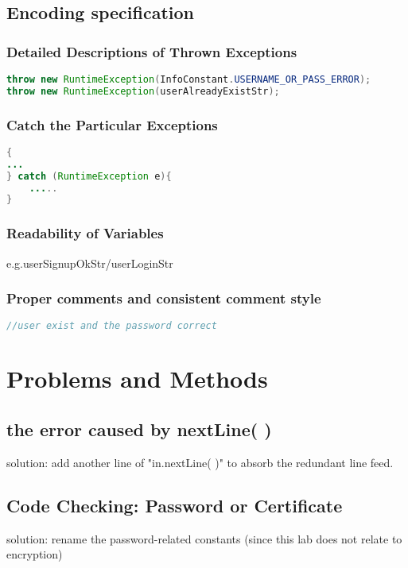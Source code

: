 \documentclass[./report.tex]{subfiles}
\begin{document}
 \subsection{Encoding specification}
  \subsubsection{Detailed Descriptions of Thrown Exceptions }
\begin{lstlisting}[language=java]
throw new RuntimeException(InfoConstant.USERNAME_OR_PASS_ERROR);
throw new RuntimeException(userAlreadyExistStr);
\end{lstlisting}

  \subsubsection{Catch the Particular Exceptions }
  \begin{lstlisting}[language=java]
{
...
} catch (RuntimeException e){
	.....
}
\end{lstlisting}
  
    \subsubsection{Readability of Variables}
    \par e.g.userSignupOkStr/userLoginStr
    
 \subsubsection{Proper comments and consistent comment style}
   \begin{lstlisting}[language=java]
//user exist and the password correct
\end{lstlisting}   
\section{Problems and Methods}
    \subsection{the error caused by nextLine( )}
    \par solution: add another line of "in.nextLine( )" to absorb the redundant line feed.
    \subsection{Code Checking: Password or Certificate }
    \par solution: rename the password-related constants (since this lab does not relate to encryption)
\end{document}
